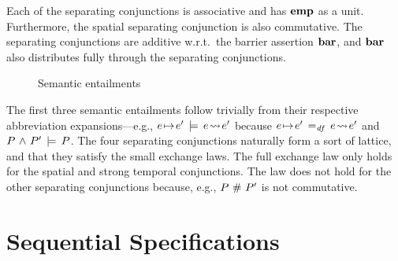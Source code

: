\documentclass[11pt]{report}
\begin{document}
Each of the separating conjunctions is associative and has $\mathbf{emp}$ as a unit. Furthermore, the spatial separating conjunction is also commutative. The separating conjunctions are additive w.r.t.\ the barrier assertion $\mathbf{bar}$, and $\mathbf{bar}$ also distributes fully through the separating conjunctions. 

\begin{figure}[ht]
    \centering
    \caption{\label{fig:sequential-entailments}Semantic entailments}
\end{figure}

The first three semantic entailments follow trivially from their respective abbreviation expansions---e.g., $e \!\mapsto\! e' \,\models\, e \!\leadsto\! e'$ because $e \!\mapsto\! e' \operatorname{\;=_{\mathit{df}}\;} e \!\leadsto\! e'$ and $P \operatorname{\,\wedge\,} P' \,\models\, P$. The four separating conjunctions naturally form a sort of lattice, and that they satisfy the small exchange laws. The full exchange law only holds for the spatial and strong temporal conjunctions. The law does not hold for the other separating conjunctions because, e.g., $P \operatorname{\,\#\,} P'$ is not commutative.

\section{Sequential Specifications}
\label{sec:sequential-specifications}
\end{document}
